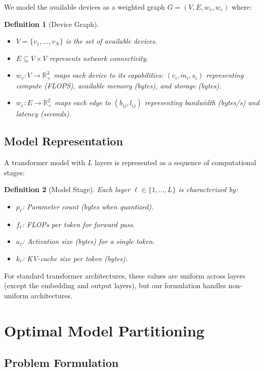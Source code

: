 \documentclass[11pt,a4paper]{article}
\newcommand{\RR}{\mathbb{R}}
\newtheorem{definition}{Definition}
\begin{document}
We model the available devices as a weighted graph $G = (V, E, w_v, w_e)$ where:

\begin{definition}[Device Graph]
\begin{itemize}
    \item $V = \{v_1, \ldots, v_N\}$ is the set of available devices.
    \item $E \subseteq V \times V$ represents network connectivity.
    \item $w_v : V \rightarrow \RR^3_+$ maps each device to its capabilities: $(c_i, m_i, s_i)$ representing compute (FLOPS), available memory (bytes), and storage (bytes).
    \item $w_e : E \rightarrow \RR^2_+$ maps each edge to $(b_{ij}, l_{ij})$ representing bandwidth (bytes/s) and latency (seconds).
\end{itemize}
\end{definition}

\subsection{Model Representation}

A transformer model with $L$ layers is represented as a sequence of computational stages:

\begin{definition}[Model Stage]
Each layer $\ell \in \{1, \ldots, L\}$ is characterized by:
\begin{itemize}
    \item $p_\ell$: Parameter count (bytes when quantized).
    \item $f_\ell$: FLOPs per token for forward pass.
    \item $a_\ell$: Activation size (bytes) for a single token.
    \item $k_\ell$: KV-cache size per token (bytes).
\end{itemize}
\end{definition}

For standard transformer architectures, these values are uniform across layers (except the embedding and output layers), but our formulation handles non-uniform architectures.

\section{Optimal Model Partitioning}

\subsection{Problem Formulation}
\end{document}
